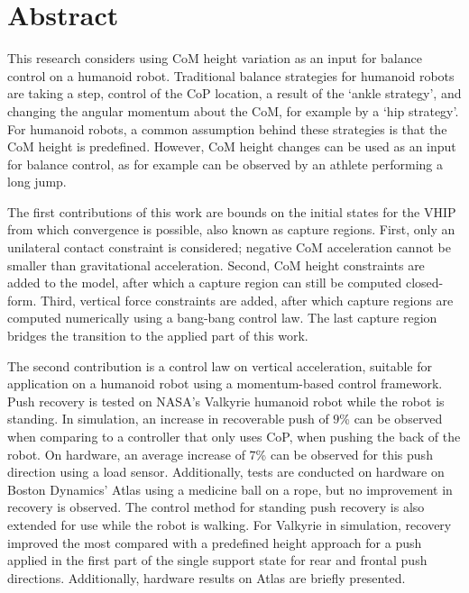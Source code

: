 %
\chapter*{Abstract}%

This research considers using \ac{CoM} height variation as an input for balance control on a humanoid robot. Traditional balance strategies for humanoid robots are taking a step, control of the \ac{CoP} location, a result of the `ankle strategy', and changing the angular momentum about the \ac{CoM}, for example by a `hip strategy'. For humanoid robots, a common assumption behind these strategies is that the \ac{CoM} height is predefined. However, \ac{CoM} height changes can be used as an input for balance control, as for example can be observed by an athlete performing a long jump. 

The first contributions of this work are bounds on the initial states for the \ac{VHIP} from which convergence is possible, also known as capture regions. First, only an unilateral contact constraint is considered; negative \ac{CoM} acceleration cannot be smaller than gravitational acceleration. Second, \ac{CoM} height constraints are added to the model, after which a capture region can still be computed closed-form. Third, vertical force constraints are added, after which capture regions are computed numerically using a bang-bang control law. The last capture region bridges the transition to the applied part of this work.

The second contribution is a control law on vertical acceleration, suitable for application on a humanoid robot using a momentum-based control framework. Push recovery is tested on NASA's Valkyrie humanoid robot while the robot is standing. In simulation, an increase in recoverable push of $9$\% can be observed when comparing to a controller that only uses \ac{CoP}, when pushing the back of the robot. On hardware, an average increase of $7$\% can be observed for this push direction using a load sensor. Additionally, tests are conducted on hardware on Boston Dynamics' Atlas using a medicine ball on a rope, but no improvement in recovery is observed. The control method for standing push recovery is also extended for use while the robot is walking. For Valkyrie in simulation, recovery improved the most compared with a predefined height approach for a push applied in the first part of the single support state for rear and frontal push directions. Additionally, hardware results on Atlas are briefly presented.